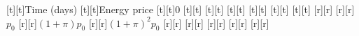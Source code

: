 %
%
\begin{psfrags}%
\psfragscanon%
%
[t][t]{\sf Time (days)}%
[t][t]{\sf Energy price}%
%
[t][t]{0}%
[t][t]{}%
[t][t]{}%
[t][t]{}%
[t][t]{}%
[t][t]{}%
[t][t]{}%
%
[r][r]{}%
[r][r]{\sf $p_0$}%
[r][r]{\sf $(1+\pi) p_0$}%
[r][r]{\sf $(1+\pi)^2 p_0$}%
[r][r]{}%
[r][r]{}%
[r][r]{}%
[r][r]{}%
[r][r]{}%
%
%
\end{psfrags}%
%
